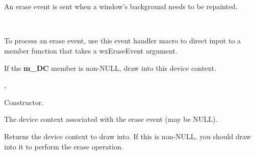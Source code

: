 \section{}\label{wxeraseevent}

An erase event is sent when a window's background needs to be repainted.


\\


To process an erase event, use this event handler macro to direct input to a member
function that takes a wxEraseEvent argument.

\twocolwidtha{7cm}
\begin{twocollist}\itemsep=0pt
\end{twocollist}%


If the {\bf m\_DC} member is non-NULL, draw into this device context.


, 




Constructor.



The device context associated with the erase event (may be NULL).

\label{wxeraseeventgetdc}


Returns the device context to draw into. If this is non-NULL, you should draw
into it to perform the erase operation.

